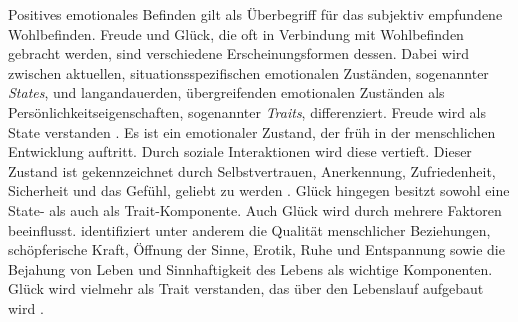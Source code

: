 Positives emotionales Befinden gilt als Überbegriff für das subjektiv empfundene Wohlbefinden. Freude und Glück, die oft in Verbindung mit Wohlbefinden gebracht werden, sind verschiedene Erscheinungsformen dessen. Dabei wird zwischen aktuellen, situationsspezifischen emotionalen Zuständen, sogenannter \textit{States}, und langandauerden, übergreifenden emotionalen Zuständen als Persönlichkeitseigenschaften, sogenannter \textit{Traits}, differenziert. Freude wird als State verstanden \parencite{Mayring1991}. Es ist ein emotionaler Zustand, der früh in der menschlichen Entwicklung auftritt. Durch soziale Interaktionen wird diese vertieft. Dieser Zustand ist gekennzeichnet durch Selbstvertrauen, Anerkennung, Zufriedenheit, Sicherheit und das Gefühl, geliebt zu werden \parencite{Izard1994}. Glück hingegen besitzt sowohl eine State- als auch als Trait-Komponente. Auch Glück wird durch mehrere Faktoren beeinflusst. \textcite{Hoffmann1984} identifiziert unter anderem die Qualität menschlicher Beziehungen, schöpferische Kraft, Öffnung der Sinne, Erotik, Ruhe und Entspannung sowie die Bejahung von Leben und Sinnhaftigkeit des Lebens als wichtige Komponenten. Glück wird  vielmehr als Trait verstanden, das über den Lebenslauf aufgebaut wird \parencite{Mayring1991}.

